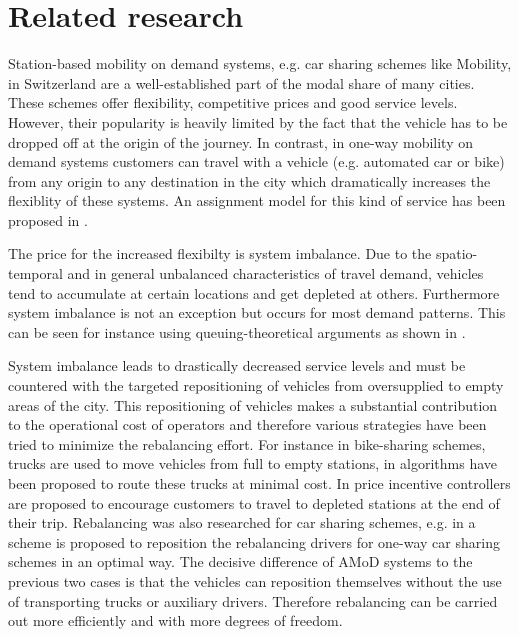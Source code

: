 \section{Related research}
\label{subs:literatureResearch}

Station-based mobility on demand systems, e.g. car sharing schemes like Mobility, in
Switzerland \citep{katzev2003car} are a well-established part of the modal share
of many cities. These schemes offer flexibility, competitive prices and good
service levels. However, their popularity is heavily limited by the fact that
the vehicle has to be dropped off at the origin of the journey. In contrast,
in one-way mobility on demand systems customers can travel with a vehicle (e.g.
automated car or bike) from any origin to any destination in the city which
dramatically increases the flexiblity of these systems. An assignment model for
this kind of service has been proposed in \cite{katzev2003car}.

The price for the increased flexibilty is system imbalance. Due to the
spatio-temporal and in general unbalanced characteristics of travel demand,
vehicles tend to accumulate at certain locations and get depleted at others.
Furthermore system imbalance is not an exception but occurs for most demand
patterns. This can be seen for instance using queuing-theoretical arguments
as shown in \citep{zhang2016control}.

System imbalance leads to drastically decreased service levels and must be
countered with the targeted repositioning of vehicles from oversupplied to empty
areas of the city. This repositioning of vehicles makes a substantial
contribution to the operational cost of operators and therefore various strategies
have been tried to minimize the rebalancing effort. For instance in bike-sharing
schemes, trucks are used to move vehicles from full to empty stations, in
\citep{pfrommer2014dynamic} algorithms have been proposed to route these
trucks at minimal cost. In \citep{ruch2014rule} price incentive controllers
are proposed to encourage customers to travel to depleted stations at the end
of their trip. Rebalancing was also researched for car sharing schemes, e.g.
in \citep{smith2013rebalancing} a scheme is proposed to reposition the
rebalancing drivers for one-way car sharing schemes in an optimal way. The
decisive difference of AMoD systems to the previous two
cases is that the vehicles can reposition themselves without the use of transporting
trucks or auxiliary drivers. Therefore rebalancing can be carried out more efficiently
and with more degrees of freedom.

